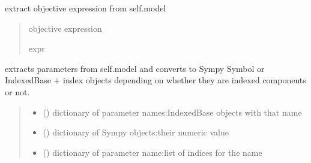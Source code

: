 \documentclass[letterpaper,10pt,english]{sphinxmanual}
\begin{document}
\begin{fulllineitems}
\begin{fulllineitems}
\label{\detokenize{src.sensitivity.sensitivity_tools:src.sensitivity.sensitivity_tools.AutoSympy.get_objective}}
\pysigstartsignatures
\pysiglinewithargsret
{}
{}
{}
\pysigstopsignatures
\sphinxAtStartPar
extract objective expression from self.model
\begin{quote}\begin{description}
\sphinxAtStartPar
objective expression

\sphinxAtStartPar
expr

\end{description}\end{quote}

\end{fulllineitems}


\begin{fulllineitems}
\label{\detokenize{src.sensitivity.sensitivity_tools:src.sensitivity.sensitivity_tools.AutoSympy.get_parameters}}
\pysigstartsignatures
\pysiglinewithargsret
{}
{}
{}
\pysigstopsignatures
\sphinxAtStartPar
extracts parameters from self.model and converts to Sympy Symbol or IndexedBase + index objects
depending on whether they are indexed components or not.
\begin{quote}\begin{description}
\sphinxAtStartPar
\begin{itemize}
\item {} 
\sphinxAtStartPar
{} () \textendash{} dictionary of parameter names:IndexedBase objects with that name

\item {} 
\sphinxAtStartPar
{} () \textendash{} dictionary of Sympy objects:their numeric value

\item {} 
\sphinxAtStartPar
{} () \textendash{} dictionary of parameter name:list of indices for the name

\end{itemize}



\end{description}
\end{quote}
\end{fulllineitems}
\end{fulllineitems}
\end{document}
